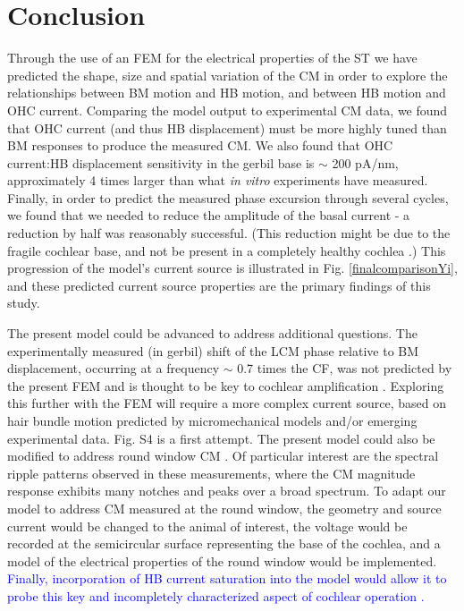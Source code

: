 \documentclass{biophys-new}
\begin{document}
{\section{Conclusion}
\par{Through the use of an FEM for the electrical properties of the ST we have predicted the shape, size and spatial variation of the CM in order to explore the relationships between BM motion and HB motion, and between HB motion and OHC current. Comparing the model output to experimental CM data, we found that OHC current (and thus HB displacement) must be more highly tuned than BM responses to produce the measured CM.  We also found that OHC current:HB displacement sensitivity in the gerbil base is $\sim$ 200 pA/nm, approximately 4 times larger than what  \textit{in vitro} experiments have measured. Finally, in order to predict the measured phase excursion through several cycles, we found that we needed to reduce the amplitude of the basal current - a reduction by half was reasonably successful. (This reduction might be due to the fragile cochlear base, and not be present in a completely healthy cochlea \cite{wang}.) This progression of the model's current source is illustrated in Fig. \ref{finalcomparisonYi}, and these predicted current source properties are the primary findings of this study. }  
\par{The present model could be advanced to address additional questions. The experimentally measured (in gerbil) shift of the LCM phase relative to BM displacement, occurring at a frequency $\sim$ 0.7 times the CF, was not predicted by the present FEM and is thought to be key to cochlear amplification \cite{nankaliwang,dongolson}. Exploring this further with the FEM will require a more complex current source, based on hair bundle motion predicted by micromechanical models and/or emerging experimental data. Fig. S4 is a first attempt.  The present model could also be modified to address round window CM \cite{charaziak2018}. Of particular interest are the spectral ripple patterns observed in these measurements, where the CM magnitude response exhibits many notches and peaks over a broad spectrum. To adapt our model to address CM measured at the round window, the geometry and source current would be changed to the animal of interest, the voltage would be recorded at the semicircular surface representing the base of the cochlea, and a model of the electrical properties of the round window would be implemented.  \textcolor{blue}{Finally, incorporation of HB current saturation into the model would allow it to probe this key and incompletely characterized aspect of cochlear operation \cite{Nam}.}}}
\end{document}
